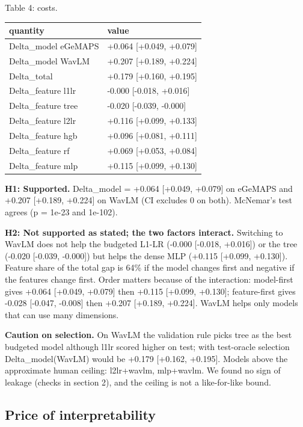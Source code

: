 \documentclass[11pt]{article}
\begin{document}
Table 4: costs.

\begin{longtable}[]{@{}ll@{}}
\toprule\noalign{}
quantity & value \\
\midrule\noalign{}
\endhead
\bottomrule\noalign{}
\endlastfoot
Delta\_model eGeMAPS & +0.064 {[}+0.049, +0.079{]} \\
Delta\_model WavLM & +0.207 {[}+0.189, +0.224{]} \\
Delta\_total & +0.179 {[}+0.160, +0.195{]} \\
Delta\_feature l1lr & -0.000 {[}-0.018, +0.016{]} \\
Delta\_feature tree & -0.020 {[}-0.039, -0.000{]} \\
Delta\_feature l2lr & +0.116 {[}+0.099, +0.133{]} \\
Delta\_feature hgb & +0.096 {[}+0.081, +0.111{]} \\
Delta\_feature rf & +0.069 {[}+0.053, +0.084{]} \\
Delta\_feature mlp & +0.115 {[}+0.099, +0.130{]} \\
\end{longtable}

\textbf{H1: Supported.} Delta\_model = +0.064 {[}+0.049, +0.079{]} on eGeMAPS and +0.207 {[}+0.189, +0.224{]} on WavLM (CI excludes 0 on both). McNemar's test agrees (p = 1e-23 and 1e-102).

\textbf{H2: Not supported as stated; the two factors interact.} Switching to WavLM does not help the budgeted L1-LR (-0.000 {[}-0.018, +0.016{]}) or the tree (-0.020 {[}-0.039, -0.000{]}) but helps the dense MLP (+0.115 {[}+0.099, +0.130{]}). Feature share of the total gap is 64\% if the model changes first and negative if the features change first. Order matters because of the interaction: model-first gives +0.064 {[}+0.049, +0.079{]} then +0.115 {[}+0.099, +0.130{]}; feature-first gives -0.028 {[}-0.047, -0.008{]} then +0.207 {[}+0.189, +0.224{]}. WavLM helps only models that can use many dimensions.

\textbf{Caution on selection.} On WavLM the validation rule picks tree as the best budgeted model although l1lr scored higher on test; with test-oracle selection Delta\_model(WavLM) would be +0.179 {[}+0.162, +0.195{]}. Models above the approximate human ceiling: l2lr+wavlm, mlp+wavlm. We found no sign of leakage (checks in section 2), and the ceiling is not a like-for-like bound.

\subsection{Price of interpretability}\label{price-of-interpretability}
\end{document}
